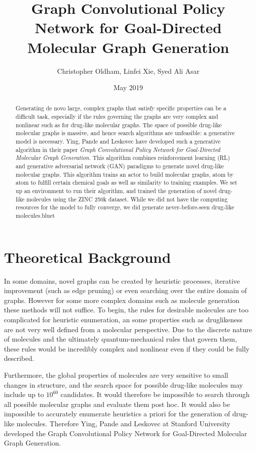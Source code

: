 \documentclass{article}
\title{Graph Convolutional Policy Network for Goal-Directed Molecular Graph Generation}
\author{Christopher Oldham, Linfei Xie, Syed Ali Asar }
\date{May 2019}
\begin{document}
\maketitle

\begin{abstract}
    Generating de novo large, complex graphs that satisfy specific properties can be a difficult task, especially if the rules governing the graphs are very complex and nonlinear such as for drug-like molecular graphs. The space of possible drug-like molecular graphs is massive, and hence search algorithms are unfeasible: a generative model is necessary. Ying, Pande and Leskovec have developed such a generative algorithm in their paper \textit{Graph Convolutional Policy Network for Goal-Directed Molecular Graph Generation}. This algorithm combines reinforcement learning (RL) and generative adversarial network (GAN) paradigms to generate novel drug-like molecular graphs. This algorithm trains an actor to build molecular graphs, atom by atom to fulfill certain chemical goals as well as similarity to training examples. We set up an environment to run their algorithm, and trained the generation of novel drug-like molecules using the ZINC 250k dataset. While we did not have the computing resources for the model to fully converge, we did generate never-before-seen drug-like molecules.bluet
\end{abstract}

\section{Theoretical Background}
In some domains, novel graphs can be created by heuristic processes, iterative improvement (such as edge pruning) or even searching over the entire domain of graphs. However for some more complex domains such as molecule generation these methods will not suffice. To begin, the rules for desirable molecules are too complicated for heuristic enumeration, an some properties such as druglikeness are not very well defined from a molecular perspective. Due to the discrete nature of molecules and the ultimately quantum-mechanical rules that govern them, these rules would be incredibly complex and nonlinear even if they could be fully described.

Furthermore, the global properties of molecules are very sensitive to small changes in structure, and the search space for possible drug-like molecules may include up to $10^{60}$ candidates. It would therefore be impossible to search through all possible molecular graphs and evaluate them post hoc. It would also be impossible to accurately enumerate heuristics a priori for the generation of drug-like molecules. Therefore Ying, Pande and Leskovec at Stanford University developed the Graph Convolutional Policy Network for Goal-Directed Molecular Graph Generation.
\end{document}
